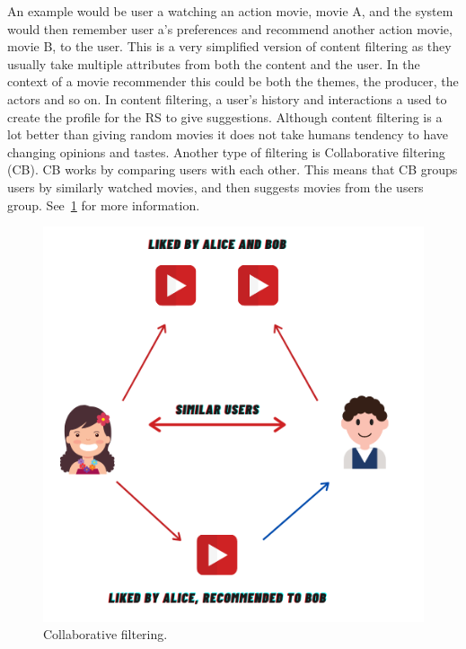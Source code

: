 An example would be user a watching an action movie, movie A, and the system would then remember user a's preferences
and recommend another action movie, movie B, to the user.\newline
This is a very simplified version of content filtering as they usually take multiple attributes from both the content
and the user.
In the context of a movie recommender this could be both the themes, the producer, the actors and so on.\newline
In content filtering, a user's history and interactions a used to create the profile for the RS to give suggestions.
Although content filtering is a lot better than giving random movies it does not take humans tendency to have changing
opinions and tastes.
Another type of filtering is Collaborative filtering (CB).
CB works by comparing users with each other.
This means that CB groups users by similarly watched movies, and then suggests movies from the users group.
See~\ref{fig:figure4} for more information.

\begin{figure}
    \centering
    \includegraphics[width=\textwidth]{images/collaborative-filtering}
    \caption{Collaborative filtering.}
    \label{fig:figure4}
\end{figure}

